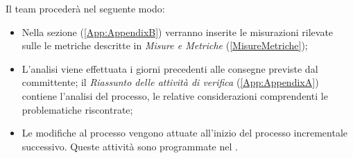 Il team procederà nel seguente modo: 
\begin{itemize}
\item Nella sezione \textit{} (\ref{App:AppendixB})  verranno inserite le misurazioni rilevate sulle le metriche descritte in \textit{Misure e Metriche} (\ref{MisureMetriche});
\item L'analisi viene effettuata i giorni precedenti alle consegne previste dal committente; il \textit{Riassunto delle attività di verifica} (\ref{App:AppendixA}) contiene l'analisi del processo, le relative considerazioni  comprendenti le problematiche riscontrate;
\item Le modifiche al processo vengono attuate all'inizio del processo incrementale successivo. Queste attività sono programmate nel \PianoDiProgetto.
\end{itemize}
